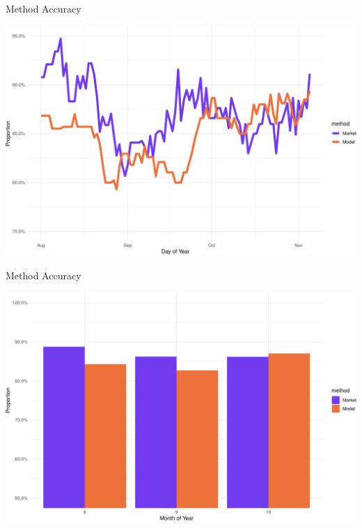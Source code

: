 \documentclass[ignorenonframetext,]{beamer}
\begin{document}
\begin{frame}{Method Accuracy}
\protect\hypertarget{method-accuracy}{}

\includegraphics{presentation_files/figure-beamer/prop_day_line-1.pdf}

\end{frame}

\begin{frame}{Method Accuracy}
\protect\hypertarget{method-accuracy-1}{}

\includegraphics{presentation_files/figure-beamer/prop_month_bars-1.pdf}

\end{frame}
\end{document}
